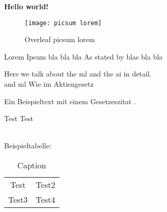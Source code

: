 \documentclass[../main.tex]{subfiles}
\begin{document}
\textbf{Hello world!}

\begin{figure}[bh]
\centering
\texttt{[image: picsum lorem]}

\label{fig:picsum lorem}
\caption{Overleaf picsum lorem}
\end{figure}

Lorem Ipsum bla\autocite[10]{smith2018} bla bla As stated by 
blas bla bla 

Here we talk about the \gls{ml} and the \gls{ai} in detail.\\ and \gls{ml}
Wie im Aktiengesetz 

Ein Beispieltext mit einem Gesetzeszitat .


Test Test \autocite[10]{johnson2020}

\\

Beispieltabelle: 


\begin{table}
    \centering
    \begin{tabular}{cc}
        Test & Test2\\
        Test3 & Test4\\
    \end{tabular}
    \caption{Caption}
    \label{tab:my_label}
\end{table}
 
\end{document}
